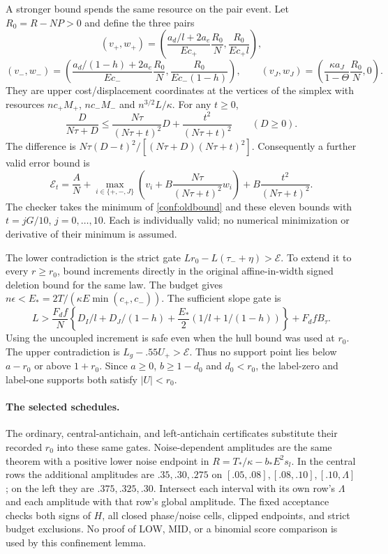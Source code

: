 A stronger bound spends the same resource on the pair event. Let
$R_0=R-NP>0$ and define the three pairs
\[
 (v_+,w_+)=\left(\frac{a_d/l+2a_e}{Ec_+}\frac{R_0}{N},
                    \frac{R_0}{Ec_+l}\right),
\]
\[
 (v_-,w_-)=\left(\frac{a_d/(1-h)+2a_e}{Ec_-}\frac{R_0}{N},
                    \frac{R_0}{Ec_-(1-h)}\right),\qquad
 (v_J,w_J)=\left(\frac{\kappa a_J}{1-\Theta}\frac{R_0}{N},0\right).
\]
They are upper cost/displacement coordinates at the vertices of the
simplex with resources $nc_+M_+$, $nc_-M_-$ and $n^{3/2}L/\kappa$.
For any $t\ge0$,
\[
 \frac{D}{N\tau+D}\le\frac{N\tau}{(N\tau+t)^2}D+
 \frac{t^2}{(N\tau+t)^2}\qquad(D\ge0).
\]
The difference is $N\tau(D-t)^2/[(N\tau+D)(N\tau+t)^2]$.
Consequently a further valid error bound is
\[
 \mathcal E_t=\frac AN+
 \max_{i\in\{+,-,J\}}\left(v_i+B\frac{N\tau}{(N\tau+t)^2}w_i\right)
 +B\frac{t^2}{(N\tau+t)^2}.
\]
The checker takes the minimum of \eqref{conf:oldbound} and these eleven
bounds with $t=jG/10$, $j=0,\ldots,10$. Each is individually valid;
no numerical minimization or derivative of their minimum is assumed.

The lower contradiction is the strict gate
$Lr_0-L(\tau_-+\eta)>\mathcal E$.
To extend it to every $r\ge r_0$, bound increments directly in the original
affine-in-width signed deletion bound for the same law. The budget gives
$n\epsilon<E_*=2T/(\kappa E\min(c_+,c_-))$. The sufficient slope gate is
\[
 L>\frac{F_df}{N}\left\{D_I/l+D_J/(1-h)
 +\frac{E_*}{2}\left(1/l+1/(1-h)\right)\right\}+F_dfB_\tau.
\]
Using the uncoupled increment is safe even when the hull bound was used
at $r_0$. The upper contradiction is $L_g-.55U_+>\mathcal E$.
Thus no support point lies below $a-r_0$ or above $1+r_0$.
Since $a\ge0$, $b\ge1-d_0$ and $d_0<r_0$, the label-zero and label-one
supports both satisfy $|U|<r_0$.


\paragraph{The selected schedules.}
The ordinary, central-antichain, and left-antichain certificates substitute
their recorded $r_0$ into these same gates. Noise-dependent amplitudes
are the same theorem with a positive lower noise endpoint in
$R=T_*/\kappa-b_*E^2s_l$. In the central rows the additional amplitudes
are $.35,.30,.275$ on $[.05,.08],[.08,.10],[.10,\Lambda]$;
on the left they are $.375,.325,.30$. Intersect each interval with its
own row's $\Lambda$ and each amplitude with that row's global amplitude.
The fixed acceptance checks both signs of $H$, all closed phase/noise
cells, clipped endpoints, and strict budget exclusions. No proof of
LOW, MID, or a binomial score comparison is used by this confinement lemma.


